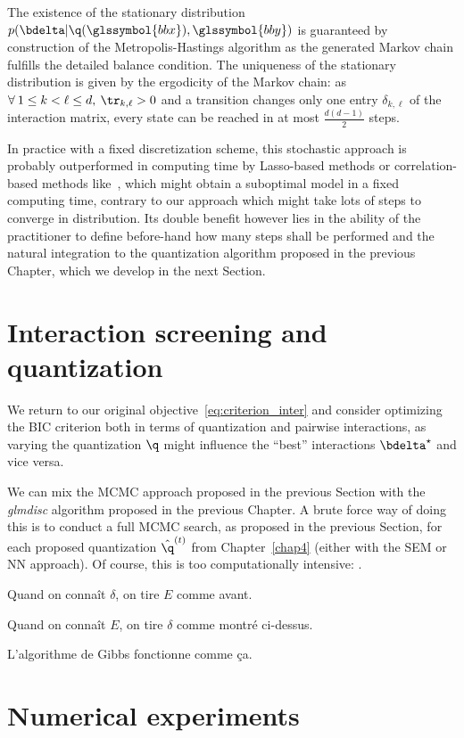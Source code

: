 The existence of the stationary distribution $p(\bdelta | \q(\glssymbol{bbx}),\glssymbol{bby})$ is guaranteed by construction of the Metropolis-Hastings algorithm as the generated Markov chain fulfills the detailed balance condition. The uniqueness of the stationary distribution is given by the ergodicity of the Markov chain: as $\forall \: 1 \leq  k < \ell \leq d, \: \tr_{k,\ell} > 0$ and a transition changes only one entry $\delta_{k,\ell}$ of the interaction matrix, every state can be reached in at most $\frac{d(d-1)}{2}$ steps.

In practice with a fixed discretization scheme, this stochastic approach is probably outperformed in computing time by Lasso-based methods or correlation-based methods like~\cite{simon}, which might obtain a suboptimal model in a fixed computing time, contrary to our approach which might take lots of steps to converge in distribution. Its double benefit however lies in the ability of the practitioner to define before-hand how many steps shall be performed and the natural integration to the quantization algorithm proposed in the previous Chapter, which we develop in the next Section.

\section{Interaction screening and quantization}

We return to our original objective~\ref{eq:criterion_inter} and consider optimizing the BIC criterion both in terms of quantization and pairwise interactions, as varying the quantization $\q$ might influence the ``best'' interactions $\bdelta^\star$ and vice versa.

We can mix the MCMC approach proposed in the previous Section with the \textit{glmdisc} algorithm proposed in the previous Chapter. A brute force way of doing this is to conduct a full MCMC search, as proposed in the previous Section, for each proposed quantization $\hat{\q}^{(t)}$ from Chapter~\ref{chap4} (either with the SEM or NN approach). Of course, this is too computationally intensive: .

Quand on connaît $\delta$, on tire $E$ comme avant.

Quand on connaît $E$, on tire $\delta$ comme montré ci-dessus.

L'algorithme de Gibbs fonctionne comme ça.



\section{Numerical experiments}

